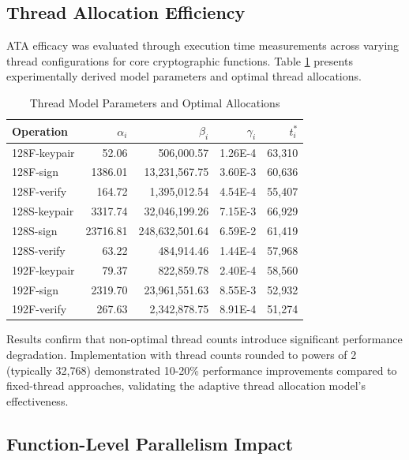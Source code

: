 \documentclass[journal]{IEEEtran}
\begin{document}
\subsection{Thread Allocation Efficiency}

ATA efficacy was evaluated through execution time measurements across varying thread configurations for core cryptographic functions. Table \ref{tab:thread_model_params} presents experimentally derived model parameters and optimal thread allocations.

\begin{table}[h]
  \centering
  \caption{Thread Model Parameters and Optimal Allocations}
  \label{tab:thread_model_params}
  \begin{tabular}{@{}lrrrr@{}}
    \toprule
    \textbf{Operation} & \boldmath$\alpha_i$ & \boldmath$\beta_i$ & \boldmath$\gamma_i$ & \boldmath$t_i^*$ \\
    \midrule
    128F-keypair & 52.06 & 506,000.57 & 1.26E-4 & 63,310 \\
    128F-sign & 1386.01 & 13,231,567.75 & 3.60E-3 & 60,636 \\
    128F-verify & 164.72 & 1,395,012.54 & 4.54E-4 & 55,407 \\
    128S-keypair & 3317.74 & 32,046,199.26 & 7.15E-3 & 66,929 \\
    128S-sign & 23716.81 & 248,632,501.64 & 6.59E-2 & 61,419 \\
    128S-verify & 63.22 & 484,914.46 & 1.44E-4 & 57,968 \\
    192F-keypair & 79.37 & 822,859.78 & 2.40E-4 & 58,560 \\
    192F-sign & 2319.70 & 23,961,551.63 & 8.55E-3 & 52,932 \\
    192F-verify & 267.63 & 2,342,878.75 & 8.91E-4 & 51,274 \\
    \bottomrule
  \end{tabular}
\end{table}

Results confirm that non-optimal thread counts introduce significant performance degradation. Implementation with thread counts rounded to powers of 2 (typically 32,768) demonstrated 10-20\% performance improvements compared to fixed-thread approaches, validating the adaptive thread allocation model's effectiveness.

\subsection{Function-Level Parallelism Impact}
\end{document}
